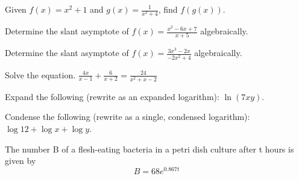 \documentclass[addpoints]{exam}
\begin{document}
\begin{questions}
    \question[1] Given $f(x) = x^2 + 1$ and $g(x) = \frac{1}{x^2 + 4}$, find $f(g(x))$. 
         
    
    \question[1] Determine the slant asymptote of $f(x) = \frac{x^2 - 6x + 7}{x + 5}$ algebraically. 
    
    \question[1] Determine the slant asymptote of $f(x) = \frac{3x^3 - 2x}{-2x^2 + 4}$ algebraically. 
    
    \newpage
    \question[1] Solve the equation. $\frac{4x}{x - 1} + \frac{6}{x + 2} = \frac{24}{x^2 + x - 2}$
    
    
    \question[1] Expand the following (rewrite as an expanded logarithm): $\ln(7xy)$. 
    
    \question[1] Condense the following (rewrite as a single, condensed logarithm): $\log 12 + \log x + \log y$. 
    
    \question[1] The number B of a flesh-eating bacteria in a petri dish culture after t hours is given by $$B = 68e^{0.867t}$$
     

\end{questions}
\end{document}
